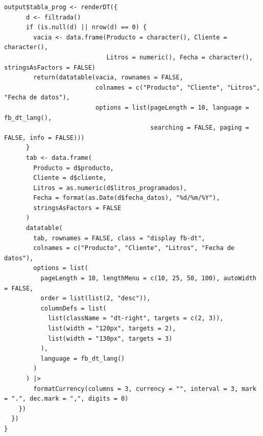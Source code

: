 \begin{lstlisting}[style=anexoR]
    output$tabla_prog <- renderDT({
      d <- filtrada()
      if (is.null(d) || nrow(d) == 0) {
        vacia <- data.frame(Producto = character(), Cliente = character(),
                            Litros = numeric(), Fecha = character(), stringsAsFactors = FALSE)
        return(datatable(vacia, rownames = FALSE,
                         colnames = c("Producto", "Cliente", "Litros", "Fecha de datos"),
                         options = list(pageLength = 10, language = fb_dt_lang(),
                                        searching = FALSE, paging = FALSE, info = FALSE)))
      }
      tab <- data.frame(
        Producto = d$producto,
        Cliente = d$cliente,
        Litros = as.numeric(d$litros_programados),
        Fecha = format(as.Date(d$fecha_datos), "%d/%m/%Y"),
        stringsAsFactors = FALSE
      )
      datatable(
        tab, rownames = FALSE, class = "display fb-dt",
        colnames = c("Producto", "Cliente", "Litros", "Fecha de datos"),
        options = list(
          pageLength = 10, lengthMenu = c(10, 25, 50, 100), autoWidth = FALSE,
          order = list(list(2, "desc")),
          columnDefs = list(
            list(className = "dt-right", targets = c(2, 3)),
            list(width = "120px", targets = 2),
            list(width = "130px", targets = 3)
          ),
          language = fb_dt_lang()
        )
      ) |>
        formatCurrency(columns = 3, currency = "", interval = 3, mark = ".", dec.mark = ",", digits = 0)
    })
  })
}
\end{lstlisting}

